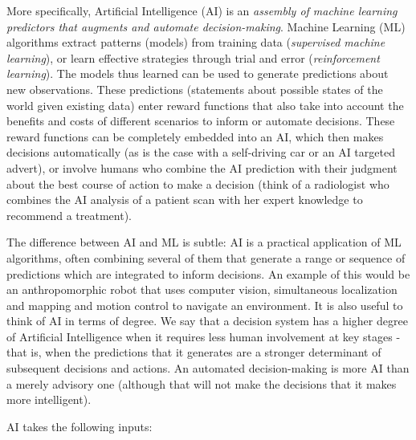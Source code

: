 \documentclass[11pt]{article}
\begin{document}
More specifically, Artificial Intelligence (AI) is an \textit{assembly of machine learning predictors that augments and automate decision-making}. Machine Learning (ML) algorithms extract patterns (models) from training data (\textit{supervised machine learning}), or learn effective strategies through trial and error (\textit{reinforcement learning}). The models thus learned can be used to generate predictions about new observations. These predictions (statements about possible states of the world given existing data) enter reward functions that also take into account the benefits and costs of different scenarios to inform or automate decisions. These reward functions can be completely embedded into an AI, which then makes decisions automatically (as is the case with a self-driving car or an AI targeted advert), or involve humans who combine the AI prediction with their judgment about the best course of action to make a decision (think of a radiologist who combines the AI analysis of a patient scan with her expert knowledge to recommend a treatment).

The difference between AI and ML is subtle: AI is a practical application of ML algorithms, often combining several of them that generate a range or sequence of predictions which are integrated to inform decisions. An example of this would be an anthropomorphic robot that uses computer vision, simultaneous localization and mapping and motion control to navigate an environment. It is also useful to think of AI in terms of degree. We say that a decision system has a higher degree of Artificial Intelligence when it requires less human involvement at key stages - that is, when the predictions that it generates are a stronger determinant of subsequent decisions and actions. An automated decision-making is more AI than a merely advisory one (although that will not make the decisions that it makes more intelligent).

AI takes the following inputs: 
\end{document}
